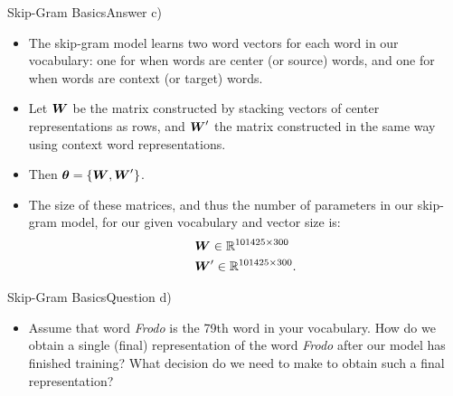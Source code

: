 \documentclass[t]{beamer}
\begin{document}
\begin{frame}{Skip-Gram Basics}{Answer c)}
    \begin{itemize}
        \item The skip-gram model learns two word vectors for each word in our
              vocabulary: one for when words are center (or source) words, and
              one for when words are context (or target) words.
        \item Let ${\boldsymbol{W}}$ be the matrix constructed by stacking vectors of center
              representations as rows, and ${\boldsymbol{W}}'$ the matrix constructed in the
              same way using context word representations.
        \item Then ${\boldsymbol{\theta}}=\{{\boldsymbol{W}}, {\boldsymbol{W}}'\}$.
        \item The size of these matrices, and thus the number of parameters in
              our skip-gram model, for our given vocabulary and vector size is:
              \begin{align*}
                   & {\boldsymbol{W}}\in\mathbb{R}^{101425\times 300}   \\
                   & {\boldsymbol{W}}'\in\mathbb{R}^{101425\times 300}.
              \end{align*}
    \end{itemize}
\end{frame}

\begin{frame}{Skip-Gram Basics}{Question d)}
    \begin{itemize}
        \item Assume that word \textit{Frodo} is the 79th word in your
              vocabulary.
              How do we obtain a single (final) representation of the word
              \textit{Frodo} after our model has finished training?
              What decision do we need to make to obtain such a final
              representation?
    \end{itemize}
\end{frame}
\end{document}
